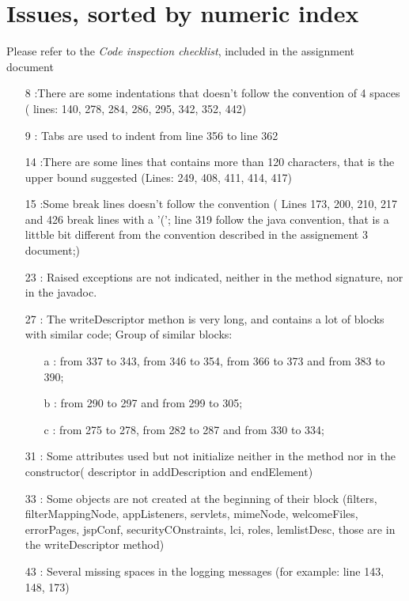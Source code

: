 \section{Issues, sorted by numeric index}
Please refer to the \textit{Code inspection checklist}, included in the assignment document

\begin{enumerate}
 \item [8]:There are some indentations that doesn't follow the convention of 4 spaces ( lines: 140, 278, 284, 286, 295, 342, 352, 442)
 \item [9]: Tabs are used to indent from line 356 to line 362
 \item [14]:There are some lines that contains more than 120 characters, that is the upper bound suggested (Lines: 249, 408, 411, 414, 417)
 \item [15]:Some break lines doesn't follow the convention ( Lines 173, 200, 210, 217 and 426 break lines with a '('; line 319 follow the java convention, that is a littble bit different from the convention described in the assignement 3 document;)
 \item [23]: Raised exceptions are not indicated, neither in the method signature, nor in the javadoc.
 \item [27]: The writeDescriptor methon is very long, and contains a lot of blocks with similar code; Group of similar blocks:
   \begin{itemize}
    \item[a]: from 337 to 343, from 346 to 354, from 366 to 373 and from 383 to 390;
    \item[b]: from 290 to 297 and from 299 to 305;
    \item[c]: from 275 to 278, from 282 to 287 and from 330 to 334;
   \end {itemize}
 \item[31]: Some attributes used but not initialize neither in the method nor in the constructor( descriptor in addDescription and endElement)
 \item[33]: Some objects are not created at the beginning of their block (filters, filterMappingNode, appListeners, servlets, mimeNode, welcomeFiles, errorPages, jspConf, securityCOnstraints, lci, roles, lemlistDesc, those are in the writeDescriptor method)
 \item [43]: Several missing spaces in the logging messages (for example: line 143, 148, 173)
\end{enumerate}
